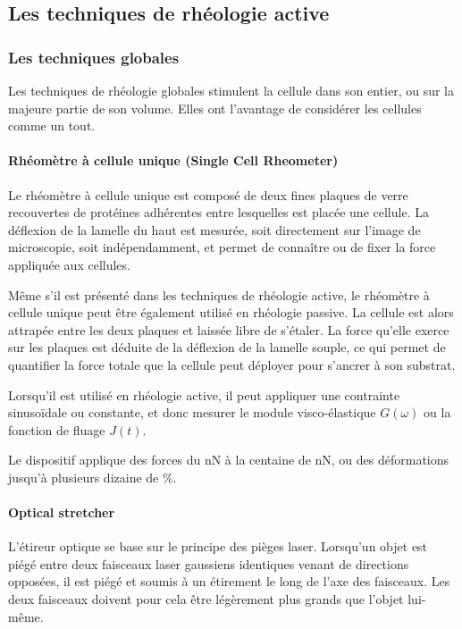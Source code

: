 \subsection{Les techniques de rhéologie active}
\subsubsection{Les techniques globales}
Les techniques de rhéologie globales stimulent la cellule dans son entier, ou sur la majeure partie de son volume. Elles ont l'avantage de considérer les cellules comme un tout. 

\paragraph{Rhéomètre à cellule unique (Single Cell Rheometer)}

Le rhéomètre à cellule unique est composé de deux fines plaques de verre recouvertes de protéines adhérentes entre lesquelles est placée une cellule. 
La déflexion de la lamelle du haut est mesurée, soit directement sur l'image de microscopie, soit indépendamment, et permet de connaître ou de fixer la force appliquée aux cellules. 

Même s'il est présenté dans les techniques de rhéologie active, le rhéomètre à cellule unique peut être également utilisé en rhéologie passive. 
La cellule est alors attrapée entre les deux plaques et laissée libre de s'étaler. La force qu'elle exerce sur les plaques est déduite de la déflexion de la lamelle souple, ce qui permet de quantifier la force totale que la cellule peut déployer pour s'ancrer à son substrat. 

Lorsqu'il est utilisé en rhéologie active, il peut appliquer une contrainte sinusoïdale ou constante, et donc mesurer le module visco-élastique $G(\omega)$ ou la fonction de fluage $J(t)$. 

Le dispositif applique des forces du nN à la centaine de nN, ou des déformations jusqu'à plusieurs dizaine de \%. 



\paragraph{Optical stretcher}

L'étireur optique se base sur le principe des pièges laser.
Lorsqu'un objet est piégé entre deux faisceaux laser gaussiens identiques venant de directions opposées, il est piégé et soumis à un étirement le long de l'axe des faisceaux. 
Les deux faisceaux doivent pour cela être légèrement plus grands que l'objet lui-même. 

